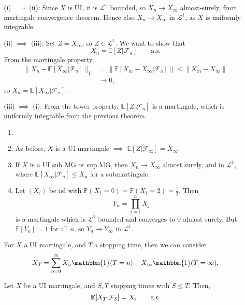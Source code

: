 \documentclass[12pt]{article}
\begin{document}
\begin{proofbox}
	

	(i) $\implies$ (ii): Since $X$ is UI, it is $\mathcal{L}^1$ bounded, so $X_n \to X_\infty$ almost-surely, from martingale convergence theorem. Hence also $X_n \to X_\infty$ in $\mathcal{L}^1$, as $X$ is uniformly integrable.

	(ii) $\implies$ (iii): Set $Z = X_\infty$, so $Z \in \mathcal{L}^1$. We want to show that
	\[
		X_n = \mathbb{E}[Z | \mathcal{F}_n] \qquad \text{a.s.}
	\]
	From the martingale property,
	\begin{align*}
		\|X_n - \mathbb{E}[X_\infty | \mathcal{F}_n]\|_1 &= \|\mathbb{E}[X_m -X_\infty | \mathcal{F}_n]\| \leq \|X_m - X_\infty\| \\
								 &\to 0,
	\end{align*}
	so $X_n = \mathbb{E}[X_\infty | \mathcal{F}_n]$.

	(iii) $\implies$ (i): From the tower property, $\mathbb{E}[Z|\mathcal{F}_n]$ is a martingale, which is uniformly integrable from the previous theorem.
\end{proofbox}

\begin{remark}
	\begin{enumerate}
		\item[]
		\item As before, $X$ is a UI martingale $\implies$ $\mathbb{E}[Z | \mathcal{F}_\infty] = X_\infty$.
		\item If $X$ is a UI sub MG or sup MG, then $X_n \to X_\infty$ almost surely, and in $\mathcal{L}^1$, where $\mathbb{E}[X_\infty | \mathcal{F}_n] \leq X_n$ for a submartingale.
		\item Let $(X_i)$ be iid with $\mathbb{P}(X_1 = 0) = \mathbb{P}(X_1 = 2) = \frac{1}{2}$. Then
			\[
			Y_n = \prod_{j = 1}^n X_j
			\]
			is a martingale which is $\mathcal{L}^1$ bounded and converges to $0$ almost-surely. But $\mathbb{E}[Y_n] = 1$ for all $n$, so $Y_n \not \to Y_\infty$ in $\mathcal{L}^1$.
	\end{enumerate}
\end{remark}

For $X$ a UI martingale, and $T$ a stopping time, then we can consider
\[
X_T = \sum_{n = 0}^{\infty} X_n \mathbbm{1}(T=n) + X_\infty \mathbbm{1}(T = \infty).
\]
\begin{theorem}
	Let $X$ be a UI martingale, and $S, T$ stopping times with $S \leq T$. Then,
	\[
		\mathbb{E}[X_T | \mathcal{F}_S] = X_s \qquad\text{\normalfont{a.s.}}
	\]
\end{theorem}
\end{document}
